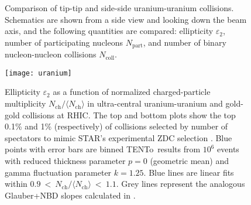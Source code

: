 \documentclass[aps,prc,reprint,amsmath,nofootinbib]{revtex4-1}
\newcommand{\trento}{T\raisebox{-.5ex}{R}ENTo}
\newcommand{\nch}{N_\text{ch}}
\begin{document}
\begin{figure}[b]
  \caption{
    \label{fig:uu-schematic}
    Comparison of tip-tip and side-side uranium-uranium collisions.
    Schematics are shown from a side view and looking down the beam axis, and the following quantities are compared:
    ellipticity $\varepsilon_2$, number of participating nucleons $N_\text{part}$, and number of binary nucleon-nucleon collisions $N_\text{coll}$.
  }
\end{figure}

\begin{figure}[b]
  \centering
  \texttt{[image: uranium]}
  \caption{
    \label{fig:uranium}
    Ellipticity $\varepsilon_2$ as a function of normalized charged-particle multiplicity
    $\nch/\langle\nch\rangle$ in ultra-central uranium-uranium and gold-gold collisions at RHIC.  The top and
    bottom plots show the top 0.1\% and 1\% (respectively) of collisions selected by number of spectators to
    mimic STAR's experimental ZDC selection \cite{FortheSTAR:2013bza}.  Blue points with error bars are binned
    \protect\trento\ results from $10^6$ events with reduced thickness parameter $p = 0$ (geometric mean) and
    gamma fluctuation parameter $k = 1.25$.  Blue lines are linear fits within
    $0.9~<~\nch/\langle\nch\rangle~<~1.1$.  Grey lines represent the analogous Glauber+NBD slopes calculated
    in \cite{FortheSTAR:2013bza}.
  }
\end{figure}
\end{document}
